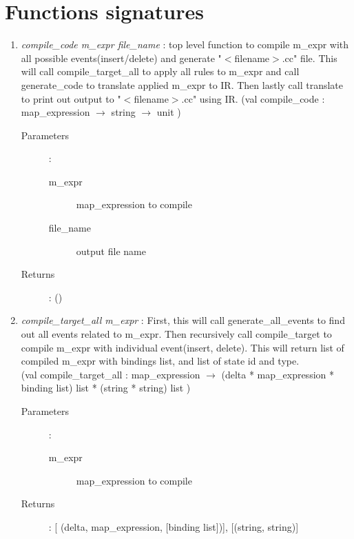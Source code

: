 \documentclass{article}
\begin{document}
\section{Functions signatures}
\begin{enumerate}
  \item \emph{compile\_code m\_expr file\_name} : top level function to compile m\_expr with all possible events(insert/delete) and generate "$<$filename$>$.cc" file. This will call compile\_target\_all to apply all rules to m\_expr and call generate\_code to translate applied m\_expr to IR. Then lastly call translate to print out output to "$<$filename$>$.cc" using IR.
(val compile\_code :  map\_expression $\rightarrow$ string $\rightarrow$ unit )
    \begin{description}
      \item[Parameters] :
        \begin{description}
          \item[m\_expr] map\_expression to compile 
          \item[file\_name] output file name 
        \end{description}
      \item[Returns] : ()
    \end{description}
    
  \item \emph{compile\_target\_all m\_expr} : First, this will call generate\_all\_events to find out all events related to m\_expr. Then recursively call compile\_target to compile m\_expr with individual event(insert, delete). This will return list of compiled m\_expr with bindings list, and list of state id and type.\\
(val compile\_target\_all : map\_expression $\rightarrow$ (delta * map\_expression * binding list) list * (string * string) list )
      \begin{description}
      \item[Parameters] :
        \begin{description}
          \item[m\_expr] map\_expression to compile 
        \end{description}
      \item[Returns] : [ (delta, map\_expression, [binding list])], [(string, string)]
    \end{description}
    

\end{enumerate}
\end{document}
